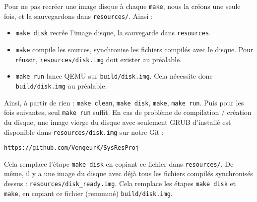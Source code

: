 \documentclass[a4paper,10pt, french]{article}
\newcommand{\code}[1]{\texttt{#1}}
\begin{document}
Pour ne pas recréer une image disque à chaque \code{make}, nous la créons une seule fois, et la sauvegardons dans \code{resources/}.
Ainsi :
\begin{itemize}
 \item \code{make disk} recrée l'image disque, la sauvegarde dans \code{resources}.
 \item \code{make} compile les sources, synchronise les fichiers compilés avec le disque. Pour réussir, \code{resources/disk.img} doit exister au préalable.
 \item \code{make run} lance QEMU sur \code{build/disk.img}. Cela nécessite donc \code{build/disk.img} au préalable.
\end{itemize}

Ainsi, à partir de rien : \code{make clean}, \code{make disk}, \code{make}, \code{make run}. Puis pour les fois suivantes, seul \code{make run} suffit.
En cas de problème de compilation / création du disque, une image vierge du disque avec seulement GRUB d'installé
est disponible dans \code{resources/disk.img} sur notre Git :
\begin{center}
 \code{https://github.com/VengeurK/SysResProj}
\end{center}
Cela remplace l'étape \code{make disk} en copiant ce fichier dans \code{resources/}. De même, il y a une image du disque avec déjà tous les fichiers compilés
synchronisés dessus : \code{resources/disk\_ready.img}.
Cela remplace les étapes \code{make disk} et \code{make}, en copiant ce fichier (renommé) \code{build/disk.img}.
\end{document}
